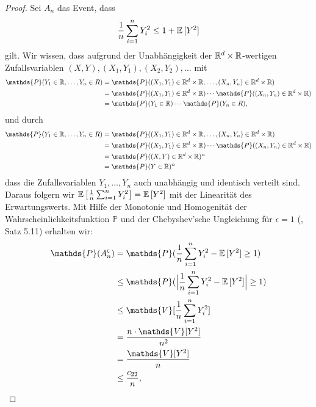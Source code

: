 \begin{proof}
Sei $A_n$ das Event, dass 
\begin{equation}
\label{event}
\frac{1}{n} \sum_{i = 1}^n Y_i^2 \leq 1 + \mathbb{E}\,[Y^2]
\end{equation}
gilt.
Wir wissen, dass aufgrund der Unabhängigkeit der $\mathbb{R}^d \times \mathbb{R}$-wertigen Zufallsvariablen  $(X, Y), (X_1, Y_1), (X_2, Y_2), \dots$ mit 
\begin{equation*}
\begin{split}
\mathds{P}(Y_1 \in \R, \dots, Y_n \in R) & = \mathds{P}((X_1, Y_1) \in \R^d \times \R, \dots, (X_n, Y_n) \in \R^d \times \R) \\
& = \mathds{P}((X_1, Y_1) \in \R^d \times \R) \cdots \mathds{P}((X_n, Y_n) \in \R^d \times \R) \\
& = \mathds{P}(Y_1 \in \R) \cdots \mathds{P}(Y_n \in R) ,
\end{split}
\end{equation*}
und durch
\begin{equation*}
\begin{split}
\mathds{P}(Y_1 \in \R, \dots, Y_n \in R) & = \mathds{P}((X_1, Y_1) \in \R^d \times \R, \dots, (X_n, Y_n) \in \R^d \times \R) \\
& = \mathds{P}((X_1, Y_1) \in \R^d \times \R) \cdots \mathds{P}((X_n, Y_n) \in \R^d \times \R) \\
& = \mathds{P}((X, Y) \in \R^d \times \R)^n \\
& = \mathds{P}(Y \in \R)^n
\end{split}
\end{equation*}
dass die Zufallsvariablen $Y_1,\dots,Y_n$ auch unabhängig und identisch verteilt sind. Daraus folgern wir $\mathbb{E}\,\big[\frac{1}{n} \sum_{i = 1}^n Y_i^2\big] = \mathbb{E}\,[Y^2]$ mit der Linearität des Erwartungswerts.
Mit Hilfe der Monotonie und Homogenität der Wahrscheinlichkeitsfunktion $\mathds{P}$ und der Chebyshev'sche Ungleichung für $\epsilon = 1$ (\cite{Klenke2013}, Satz 5.11) erhalten wir:
\begin{equation}
\label{tscheby}
\begin{split}
\mathds{P}(A_n^{\mathsf{c}}) & = \mathds{P}(\frac{1}{n}\sum_{i=1}^n Y_i^2 - \E[Y^2] \geq 1) \\
& \leq \mathds{P}(\Big|\frac{1}{n}\sum_{i=1}^n Y_i^2 - \E[Y^2]\Big| \geq 1) \\
& \leq \mathds{V}[\frac{1}{n}\sum_{i = 1}^nY_i^2] \\
& = \frac{n \cdot  \mathds{V}[Y^2]}{n^2} \\
& = \frac{\mathds{V}[Y^2]}{n} \\
& \leq \frac{c_{22}}{n},

\end{split}
\end{equation}
\end{proof}
